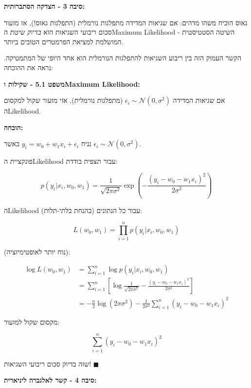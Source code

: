 \textbf{סיבה \num{3} - הצדקה הסתברותית:}

גאוס הוכיח משהו מדהים: אם שגיאות המדידה מתפלגות נורמלית (התפלגות גאוס!), אז מזעור סכום ריבועי השגיאות הוא \textit{בדיוק} שיטת ה\en{-}Maximum Likelihood - השיטה הסטטיסטית המושלמת למציאת הפרמטרים הטובים ביותר.

הקשר העמוק הזה בין ריבוע השגיאות להתפלגות הנורמלית הוא אחד היופי של המתמטיקה. נראה את ההוכחה:

\textbf{משפט \num{5.1} - שקילות  ו\en{-}Maximum Likelihood:}

אם שגיאות המדידה $\epsilon_i \sim \mathcal{N}(0, \sigma^2)$ (מתפלגות נורמלית), אזי מזעור  שקול למקסום ה\en{-}Likelihood.

\textbf{הוכחה:}

נניח $y_i = w_0 + w_1 x_i + \epsilon_i$ כאשר $\epsilon_i \sim \mathcal{N}(0, \sigma^2)$.

פונקציית ה\en{-}Likelihood עבור תצפית בודדת:

\begin{equation}
p(y_i | x_i, w_0, w_1) = \frac{1}{\sqrt{2\pi\sigma^2}} \exp\left(-\frac{(y_i - w_0 - w_1 x_i)^2}{2\sigma^2}\right)
\end{equation}

ה\en{-}Likelihood עבור כל הנתונים (בהנחת בלתי-תלות):

\begin{equation}
L(w_0, w_1) = \prod_{i=1}^{n} p(y_i | x_i, w_0, w_1)
\end{equation}

 (נוח יותר לאופטימיזציה):

\begin{align}
\log L(w_0, w_1) &= \sum_{i=1}^{n} \log p(y_i | x_i, w_0, w_1) \nonumber \\
&= \sum_{i=1}^{n} \left[ \log\frac{1}{\sqrt{2\pi\sigma^2}} - \frac{(y_i - w_0 - w_1 x_i)^2}{2\sigma^2} \right] \nonumber \\
&= -\frac{n}{2}\log(2\pi\sigma^2) - \frac{1}{2\sigma^2} \sum_{i=1}^{n} (y_i - w_0 - w_1 x_i)^2
\end{align}

מקסום  שקול למזעור:

\begin{equation}
\sum_{i=1}^{n} (y_i - w_0 - w_1 x_i)^2
\end{equation}

שזה בדיוק סכום ריבועי השגיאות! $\blacksquare$

\textbf{סיבה \num{4} - קשר לאלגברה ליניארית:}

